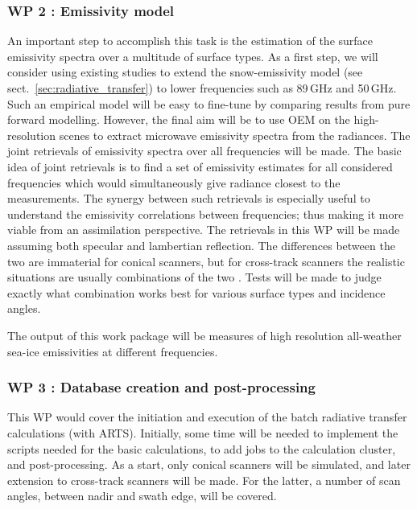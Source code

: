 \documentclass[12pt,oneside,a4paper]{article}
\begin{document}
\subsubsection*{WP 2 : Emissivity model}
%
\label{sec:emissivity}
An important step to accomplish this task is the estimation of the surface emissivity spectra over a multitude of surface types. As a first step, we will consider using existing studies to extend the snow-emissivity model (see sect.~\ref{sec:radiative_transfer}) to lower frequencies such as 89\,GHz and 50\,GHz. Such an empirical model will be easy to fine-tune by comparing results from pure forward modelling. However, the final aim will be to use OEM on the high-resolution scenes to extract microwave emissivity spectra from the radiances. The joint retrievals of emissivity spectra over all frequencies will be made. The basic idea of joint retrievals is to find a set of emissivity estimates for all considered frequencies which would simultaneously give radiance closest to the measurements. The synergy between such retrievals is especially useful to understand the emissivity correlations between frequencies; thus making it more viable from an assimilation perspective. The retrievals in this WP will be made assuming both specular and lambertian reflection. The differences between the two are immaterial for conical scanners, but for cross-track scanners the realistic situations are usually combinations of the two \citep{matzler:2005:onthe}. Tests will be made to judge exactly what combination works best for various surface types and incidence angles. 


The output of this work package will be measures of high resolution all-weather sea-ice emissivities at different frequencies. 
	
\subsubsection*{WP 3 : Database creation and post-processing}
%
\label{sec:database}	
This WP would cover the initiation and execution of the batch radiative transfer calculations (with ARTS). Initially, some time will be needed to implement the scripts needed for the basic calculations, to add jobs to the calculation cluster, and post-processing. As a start, only conical scanners will be simulated, and later extension to cross-track scanners will be made. For the latter, a number of scan angles, between nadir and swath edge, will be covered.
\end{document}
